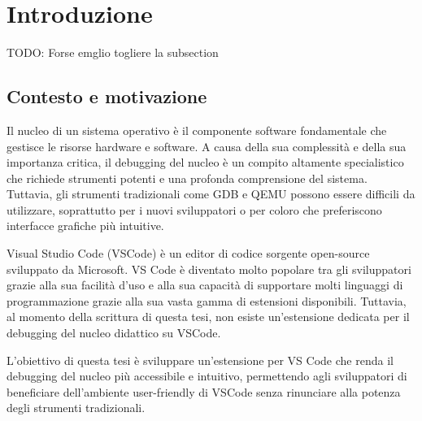 \chapter{Introduzione}
TODO: Forse emglio togliere la subsection
\section{Contesto e motivazione}
Il nucleo di un sistema operativo è il componente software fondamentale che gestisce le risorse hardware e software. A causa della sua complessità e della sua importanza critica, il debugging del nucleo è un compito altamente specialistico che richiede strumenti potenti e una profonda comprensione del sistema. Tuttavia, gli strumenti tradizionali come GDB e QEMU possono essere difficili da utilizzare, soprattutto per i nuovi sviluppatori o per coloro che preferiscono interfacce grafiche più intuitive.

Visual Studio Code (VSCode) è un editor di codice sorgente open-source sviluppato da Microsoft. VS Code è diventato molto popolare tra gli sviluppatori grazie alla sua facilità d'uso e alla sua capacità di supportare molti linguaggi di programmazione grazie alla sua vasta gamma di estensioni disponibili. Tuttavia, al momento della scrittura di questa tesi, non esiste un'estensione dedicata per il debugging del nucleo didattico su VSCode.

L'obiettivo di questa tesi è sviluppare un'estensione per VS Code che renda il debugging del nucleo più accessibile e intuitivo, permettendo agli sviluppatori di beneficiare dell'ambiente user-friendly di VSCode senza rinunciare alla potenza degli strumenti tradizionali.
